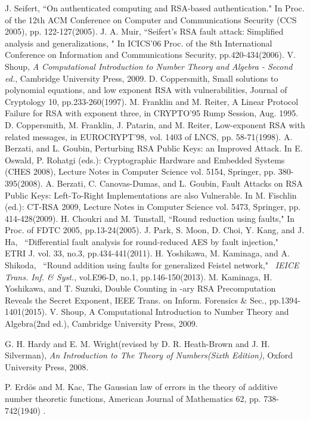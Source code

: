 \documentclass{article}
\begin{document}
\begin{thebibliography}{}
 J. Seifert, 
``On authenticated computing and RSA-based authentication." In Proc. of the 12th
ACM Conference on Computer and Communications Security (CCS 2005), pp. 122-127(2005).
 J. A. Muir, ``Seifert's RSA fault attack: Simplified analysis and generalizations, "
In ICICS'06 Proc. of the 8th International Conference on Information and Communications Security, 
pp.420-434(2006).
 V. Shoup, 
{\it A Computational Introduction to Number Theory and Algebra - Second ed.}, 
Cambridge University Press, 2009.
D. Coppersmith, Small solutions to polynomial
equations, and low exponent RSA with vulnerabilities,
Journal of Cryptology 10, pp.233-260(1997).
M. Franklin and M. Reiter, A Linear Protocol Failure for RSA with exponent three, in
CRYPTO'95 Rump Session, Aug. 1995.
D. Coppersmith, M. Franklin, J. Patarin, and
M. Reiter, Low-exponent RSA with related
messages, in EUROCRYPT'98, vol. 1403 of
LNCS, pp. 58-71(1998).
 A. Berzati, and L. Goubin, 
Perturbing RSA Public Keys: an Improved Attack. In 
E. Oswald, P. Rohatgi (eds.): Cryptographic Hardware and
Embedded Systems (CHES 2008), Lecture Notes in Computer Science vol. 5154, Springer, 
pp. 380-395(2008).
 A. Berzati, C. Canovas-Dumas, and L. Goubin, 
Fault Attacks on RSA Public Keys: Left-To-Right Implementations are also Vulnerable. In 
M. Fischlin (ed.): CT-RSA 2009, Lecture Notes in Computer Science vol. 5473, Springer, 
pp. 414-428(2009).
 H. Choukri and M. Tunstall,
``Round reduction using faults," In Proc. of FDTC 2005, pp.13-24(2005).
 J. Park, S. Moon, D. Choi, Y. Kang, and J. Ha,~
``Differential fault analysis for round-reduced AES by fault injection,"~
ETRI J. vol. 33, no.3, pp.434-441(2011).
 H. Yoshikawa, M. Kaminaga, and A. Shikoda,~
``Round addition using faults for generalized Feistel network,"~
{\em IEICE Trans. Inf. \& Syst.}, vol.E96-D, no.1, pp.146-150(2013).
 M. Kaminaga, H. Yoshikawa, and T. Suzuki, 
Double Counting in -ary RSA Precomputation Reveals the Secret Exponent, 
IEEE Trans. on Inform. Forensics \& Sec., pp.1394-1401(2015).
V. Shoup, A Computational Introduction to Number Theory and Algebra(2nd ed.), Cambridge University Press, 2009.

 G. H. Hardy and E. M. Wright(revised by D. R. Heath-Brown and J. H. Silverman), 
{\it An Introduction to The Theory of Numbers(Sixth Edition)}, Oxford University Press, 2008.

 P. Erd\"os and M. Kac, 
The Gaussian law of errors in the theory of additive number theoretic functions, 
American Journal of Mathematics 62, pp. 738-742(1940) .
\end{thebibliography}
\end{document}
